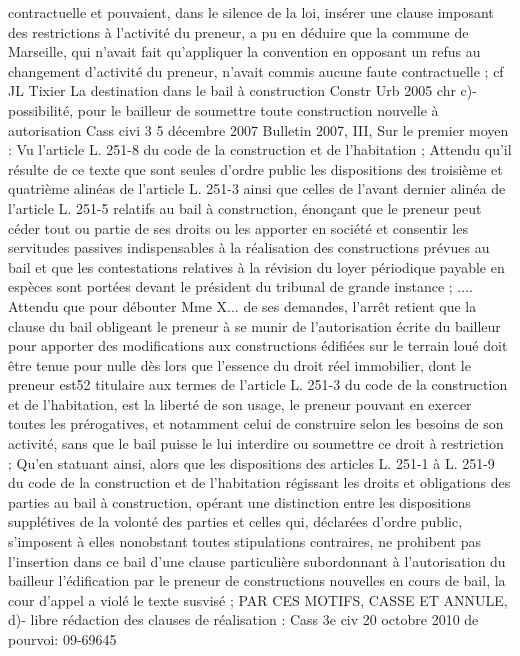 \documentclass[11pt,a4paper]{report}
\begin{document}
	contractuelle et pouvaient, dans le silence de la loi, insérer une clause imposant des restrictions à l'activité du
	preneur, a pu en déduire que la commune de Marseille, qui n'avait fait qu'appliquer la convention en opposant
	un refus au changement d'activité du preneur, n'avait commis aucune faute contractuelle ; cf JL Tixier La
	destination dans le bail à construction Constr Urb 2005 chr 
	c)- possibilité, pour le bailleur de soumettre toute construction nouvelle à autorisation
	Cass civi 3 5 décembre 2007 Bulletin 2007, III, 
	Sur le premier moyen :
	Vu l'article L. 251-8 du code de la construction et de l'habitation ;
	Attendu qu'il résulte de ce texte que sont seules d'ordre public les dispositions des troisième et quatrième alinéas
	de l'article L. 251-3 ainsi que celles de l'avant dernier alinéa de l'article L. 251-5 relatifs au bail à construction,
	énonçant que le preneur peut céder tout ou partie de ses droits ou les apporter en société et consentir les
	servitudes passives indispensables à la réalisation des constructions prévues au bail et que les contestations
	relatives à la révision du loyer périodique payable en espèces sont portées devant le président du tribunal de
	grande instance ;
	....
	Attendu que pour débouter Mme X... de ses demandes, l'arrêt retient que la clause du bail obligeant le preneur à
	se munir de l'autorisation écrite du bailleur pour apporter des modifications aux constructions édifiées sur le
	terrain loué doit être tenue pour nulle dès lors que l'essence du droit réel immobilier, dont le preneur est52
	titulaire aux termes de l'article L. 251-3 du code de la construction et de l'habitation, est la liberté de son usage,
	le preneur pouvant en exercer toutes les prérogatives, et notamment celui de construire selon les besoins de son
	activité, sans que le bail puisse le lui interdire ou soumettre ce droit à restriction ;
	Qu'en statuant ainsi, alors que les dispositions des articles L. 251-1 à L. 251-9 du code de la construction et de
	l'habitation régissant les droits et obligations des parties au bail à construction, opérant une distinction entre les
	dispositions supplétives de la volonté des parties et celles qui, déclarées d'ordre public, s'imposent à elles
	nonobstant toutes stipulations contraires, ne prohibent pas l'insertion dans ce bail d'une clause particulière
	subordonnant à l'autorisation du bailleur l'édification par le preneur de constructions nouvelles en cours de
	bail, la cour d'appel a violé le texte susvisé ;
	PAR CES MOTIFS, CASSE ET ANNULE,
	d)- libre rédaction des clauses de réalisation : Cass 3e civ 20 octobre 2010 \No  de pourvoi: 09-69645
\end{document}
